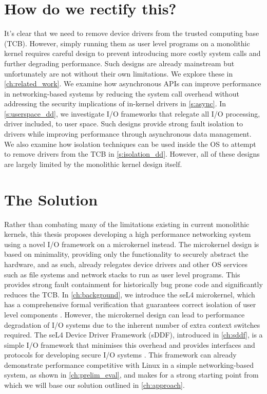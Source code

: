 \section{How do we rectify this?}
It's clear that we need to remove device drivers from the trusted computing base (TCB). However, simply 
running them as user level programs on a monolithic kernel requires careful design to prevent introducing
more costly system calls and further degrading performance. Such designs are already mainstream but unfortunately
are not without their own limitations. We explore these in \autoref{ch:related_work}. We examine how
asynchronous APIs can improve
performance in networking-based systems by reducing the system call overhead without addressing the security
implications of in-kernel drivers in \autoref{s:async}. In \autoref{s:userspace_dd}, we investigate I/O frameworks
that relegate all I/O processing, driver included, to user space. Such designs provide strong fault isolation to
drivers while improving performance through asynchronous data management. 
We also examine how isolation techniques can be used inside the OS to attempt to remove
drivers from the TCB in \autoref{s:isolation_dd}.
However, all of these designs are largely limited by the monolithic kernel design itself.

\section{The Solution}
Rather than combating many of the limitations existing in current monolithic kernels,
this thesis proposes developing a high performance networking system using a novel I/O framework on
a microkernel instead. The microkernel design is based on minimality, providing only the functionality to
securely abstract the hardware, and as such, already relegates device drivers and
other OS services such as file systems and network stacks to run as user level programs. This provides
strong fault containment for historically bug prone code and significantly reduces the TCB.
In \autoref{ch:background}, we introduce the seL4 microkernel, which has a comprehensive formal verification
that guarantees correct isolation of user level components \cite{Klein_AEMSKH_14}.
However, the microkernel design can lead to performance
degradation of I/O systems due to the inherent number of extra context switches required. The seL4 Device Driver
Framework (sDDF), introduced in \autoref{ch:sddf}, is a simple I/O framework that minimises this overhead
and provides interfaces and protocols for developing secure I/O systems \cite{Parker_22:sddf}. This 
framework can already demonstrate performance competitive with Linux in a simple networking-based
system, as shown in \autoref{ch:prelim_eval}, and makes for a strong starting point from which we will base our
solution outlined in \autoref{ch:approach}.
